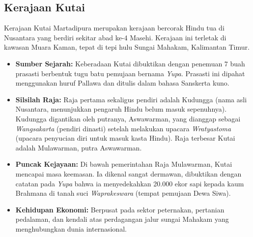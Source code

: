 \documentclass[12pt, a4paper]{article}
\begin{document}
\subsection{Kerajaan Kutai}
Kerajaan Kutai Martadipura merupakan kerajaan bercorak Hindu tua di Nusantara yang berdiri sekitar abad ke-4 Masehi. Kerajaan ini terletak di kawasan Muara Kaman, tepat di tepi hulu Sungai Mahakam, Kalimantan Timur.
\begin{itemize}
	\item \textbf{Sumber Sejarah:} Keberadaan Kutai dibuktikan dengan penemuan 7 buah prasasti berbentuk tugu batu pemujaan bernama \textit{Yupa}. Prasasti ini dipahat menggunakan huruf Pallawa dan ditulis dalam bahasa Sanskerta kuno.
	\item \textbf{Silsilah Raja:} Raja pertama sekaligus pendiri adalah Kudungga (nama asli Nusantara, menunjukkan pengaruh Hindu belum masuk sepenuhnya). Kudungga digantikan oleh putranya, Aswawarman, yang dianggap sebagai \textit{Wangsakarta} (pendiri dinasti) setelah melakukan upacara \textit{Wratyastoma} (upacara penyucian diri untuk masuk kasta Hindu). Raja terbesar Kutai adalah Mulawarman, putra Aswawarman.
	\item \textbf{Puncak Kejayaan:} Di bawah pemerintahan Raja Mulawarman, Kutai mencapai masa keemasan. Ia dikenal sangat dermawan, dibuktikan dengan catatan pada \textit{Yupa} bahwa ia menyedekahkan 20.000 ekor sapi kepada kaum Brahmana di tanah suci \textit{Waprakeswara} (tempat pemujaan Dewa Siwa).
	\item \textbf{Kehidupan Ekonomi:} Berpusat pada sektor peternakan, pertanian pedalaman, dan kendali atas perdagangan jalur sungai Mahakam yang menghubungkan dunia internasional.
\end{itemize}
\end{document}
